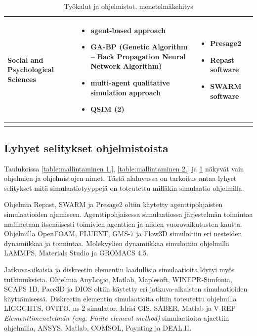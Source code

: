 \documentclass[utf8]{gradu3}
\begin{document}
\begin{longtable}[h]{|p{4cm}|p{6cm}|p{5cm}|}
    \\
    \hline
        Social and Psychological Sciences & \begin{itemize}
        \item agent-based approach
        \item GA-BP (Genetic Algorithm – Back Propagation Neural Network Algorithm)
        \item multi-agent qualitative simulation approach
        \item QSIM (2)
    \end{itemize} &
    \begin{itemize}
        \item Presage2
        \item Repast software
        \item SWARM software
    \end{itemize}
    \\
    \hline
    \caption{Työkalut ja ohjelmistot, menetelmäkehitys}
    \label{table:mallintaminen 3.}
\end{longtable}

\subsection{Lyhyet selitykset ohjelmistoista} \label{selitys}
Taulukoissa \ref{table:mallintaminen 1.}, \ref{table:mallintaminen 2.} 
ja \ref{table:mallintaminen 3.} näkyvät vain ohjelmien ja ohjelmistojen nimet.
Tästä alaluvussa on tarkoitus antaa lyhyet selitykset mitä simulaatiotyyppejä 
on toteutettu milläkin simulaatio-ohjelmilla. 

Ohjelmia Repast, SWARM ja Presage2 oltiin käytetty agenttipohjaisten simulaatioiden ajamiseen.
Agenttipohjaisessa simulaatiossa järjestelmän toimintaa mallinetaan itsenäisesti toimivien
agenttien ja niiden vuorovaikutusten kautta.
Ohjelmilla OpenFOAM, FLUENT, GMS-7 ja Flow3D simuloitiin eri nesteiden dynamiikkaa ja toimintaa.
Molekyylien dynamiikkaa simuloitiin ohjelmilla 
LAMMPS, Materials Studio ja GROMACS 4.5.

Jatkuva-aikaisia ja diskreetin elementin laadullisia 
simulaatioita löytyi myös tutkimuksista.
Ohjelmia AnyLogic, Matlab, Maplesoft, WINEPR-Simfonia, SCAPS 1D, Pace3D ja DIOS 
oltiin käytetty eri jatkuva-aikaisten simulaatioiden käyttämisessä.
Diskreetin elementin simulaatioita oltiin toteutettu ohjelmilla
LIGGGHTS, OVITO, ns-2 simulator, Idrisi GIS, SABER, Matlab ja V-REP
\textit{Elementtimenetelmän (eng. Finite element method)} simulaatioita
ajaettiin ohjelmilla, ANSYS, Matlab, COMSOL, Poynting ja DEAL.II.
\end{document}

